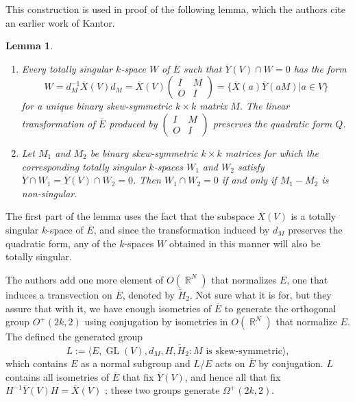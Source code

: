\documentclass[a4paper]{article}
\DeclareMathOperator{\R}{\mathbb{R}}
\DeclareMathOperator{\GL}{GL}
\newtheorem{lemma}{Lemma}
\begin{document}
  This construction is used in proof of the following lemma,
  which the authors cite an earlier work of Kantor.

  \begin{lemma}
    \begin{enumerate}
      \item Every totally singular $k$-space $W$ of
        $\overline{E}$ such that $\overline{Y}(V) \cap W =
        0$ has the form
        \[
          W = d_M^{-1} \overline{X}(V) d_M
          = \overline{X}(V)
          \begin{pmatrix} I & M \\ O & I \end{pmatrix} 
          = \{\overline{X}(a)\overline{Y}(aM) | a \in V\}
        \] 
        for a unique binary skew-symmetric $k \times k$ 
        matrix $M$. The linear transformation of
        $\overline{E}$ produced by $\begin{pmatrix} I & M \\
        O & I\end{pmatrix}$ preserves the quadratic form
        $Q$.
      \item Let $M_1$ and $M_2$ be binary skew-symmetric $k
        \times k$ matrices for which the corresponding
        totally singular $k$-spaces $W_1$ and $W_2$ satisfy
        $\overline{Y} \cap W_1 = \overline{Y}(V) \cap W_2 =
        0$. Then $W_1 \cap W_2 = 0$ if and only if $M_1 -
        M_2$ is non-singular.
    \end{enumerate}
  \end{lemma}
  The first part of the lemma uses the fact that the
  subspace $\overline{X}(V)$ is a totally singular $k$-space
  of $\overline{E}$, and since the transformation induced by
  $d_M$ preserves the quadratic form, any of the $k$-spaces
  $W$ obtained in this manner will also be totally singular. 

  The authors add one more element of $O(\R^{N})$ that
  normalizes $E$, one that induces a transvection on
  $\overline{E}$, denoted by $\tilde H_2$. Not sure what it
  is for, but they assure that with it, we have enough
  isometries of $ \overline{E}$ to generate the orthogonal
  group $O^{+}(2k,2)$ using conjugation by isometries in
  $O(\R^{N})$ that normalize $E$. The defined the generated
  group
  \begin{equation}
    L := \langle E, \GL(V), d_M, H, \tilde H_2 : M \text{ is
      skew-symmetric}\rangle,
  \end{equation}
  which contains $E$ as a normal subgroup and $L / E$ acts
  on $\overline{E}$ by conjugation. $L$ contains all
  isometries of $\overline{E}$ that fix $\overline{Y}(V)$,
  and hence all that fix $H^{-1}\overline{Y}(V)H =
  \overline{X}(V)$ ; these two groups generate
  $\Omega^{+}(2k,2)$.
\end{document}
